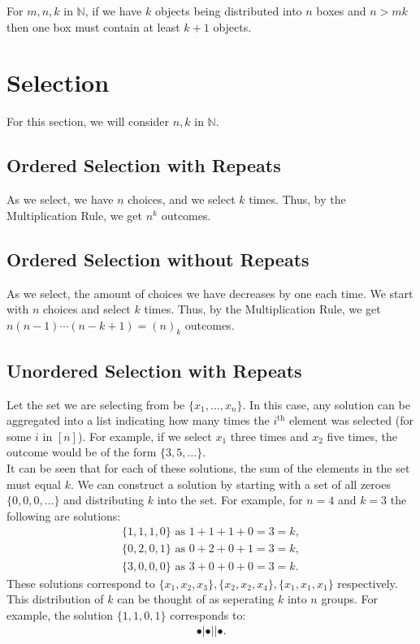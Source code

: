 \documentclass[a4paper, 12pt, twoside]{article}
\begin{document}
For $m, n, k$ in $\mathbb{N}$, if we have $k$ objects being 
distributed into $n$ boxes and $n > mk$ then one box must contain
at least $k + 1$ objects.

\newpage

\section{Selection}

For this section, we will consider $n, k$ in $\mathbb{N}$.

\subsection{Ordered Selection with Repeats}

As we select, we have $n$ choices, and we select $k$ times. Thus,
by the Multiplication Rule, we get $n^k$ outcomes.

\subsection{Ordered Selection without Repeats}

As we select, the amount of choices we have decreases by one each time.
We start with $n$ choices and select $k$ times. Thus, by the Multiplication
Rule, we get \newline $n(n-1)\cdots(n-k+1) = (n)_k$ outcomes.

\subsection{Unordered Selection with Repeats}

Let the set we are selecting from be $\{x_1, \ldots, x_n\}$. In this case, 
any solution can be aggregated into a list indicating how
many times the $i^{\text{th}}$ element was selected (for some $i$ in $[n]$).
For example, if we select $x_1$ three times and $x_2$ five times, 
the outcome would be of the form $\{3, 5, \ldots\}$.
\\[\baselineskip]
It can be seen that for each of these solutions, the sum of the elements in
the set must equal $k$. We can construct a solution by starting with a set
of all zeroes $\{0, 0, 0, \ldots\}$ and distributing $k$ into the set. For
example, for $n = 4$ and $k = 3$ the following are solutions: \begin{gather*}
  \{1, 1, 1, 0\} \text{ as } 1 + 1 + 1 + 0 = 3 = k, \\
  \{0, 2, 0, 1\} \text{ as } 0 + 2 + 0 + 1 = 3 = k, \\
  \{3, 0, 0, 0\} \text{ as } 3 + 0 + 0 + 0 = 3 = k.
\end{gather*} These solutions correspond to $\{x_1, x_2, x_3\}, 
\{x_2, x_2, x_4\}, \{x_1, x_1, x_1\}$ respectively.
\\[\baselineskip]
This distribution of $k$ can be thought of as seperating $k$ into $n$
groups. For example, the solution $\{1, 1, 0, 1\}$ corresponds to: \begin{gather*}
  \bullet | \bullet | | \bullet.
\end{gather*} 
\end{document}
